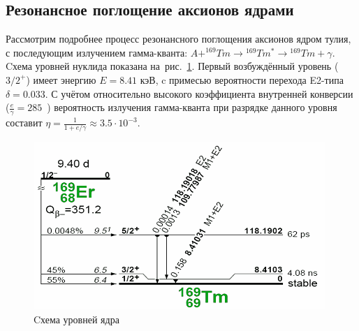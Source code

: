 \documentclass[a4paper,article,14pt]{extarticle}
\begin{document}
\subsection{Резонансное поглощение аксионов ядрами {\Tm}}

Рассмотрим подробнее процесс резонансного поглощения аксионов ядром тулия, с последующим излучением гамма-кванта: $A + ^{169}Tm \rightarrow {}^{169}Tm^{*} \rightarrow {}^{169}Tm + \gamma$.
Cхема уровней нуклида {\Tm} показана на~рис.~\ref{tmlvls}.
Первый возбуждённый уровень ($3/2^+$) имеет энергию $E = 8.41 \text{\ кэВ}$, c  примесью вероятности перехода E2-типа $\delta = 0.033$.
С учётом относительно высокого коэффициента внутренней конверсии ($\frac{e}{\gamma} = 285$~\cite{lederer1978table}) вероятность излучения гамма-кванта при разрядке данного уровня составит $\eta = \frac{1}{1 + e/\gamma} \approx 3.5 \cdot 10^{-3}$.
\begin{figure}[t]
    \centering
    \includegraphics[width = 0.75 \textwidth]{images/Tmlevels.png}
    \caption{Cхема уровней ядра {\Tm}~\cite{lederer1978table}}\label{tmlvls}
\end{figure}
\end{document}
